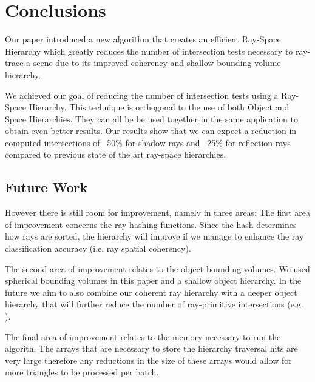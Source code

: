 
\chapter{Conclusions}
\label{chapter:conclusions}

Our paper introduced a new algorithm that creates an efficient Ray-Space Hierarchy which greatly reduces the number of intersection tests necessary to ray-trace a scene due to its improved coherency and shallow bounding volume hierarchy.

\medskip

We achieved our goal of reducing the number of intersection tests using a Ray-Space Hierarchy. This technique is orthogonal to the use of both Object and Space Hierarchies. They can all be be used together in the same application to obtain even better results.
Our results show that we can expect a reduction in computed intersections of ~50\% for shadow rays and ~25\% for reflection rays compared to previous state of the art ray-space hierarchies.

\section{Future Work}
\label{section:future-work}

However there is still room for improvement, namely in three areas: The first area of improvement concerns the ray hashing functions. Since the hash determines how rays are sorted, the hierarchy will improve if we manage to enhance the ray classification accuracy (i.e. ray spatial coherency).

\medskip

The second area of improvement relates to the object bounding-volumes. We used spherical bounding volumes in this paper and a shallow object hierarchy. In the future we aim to also combine our coherent ray hierarchy with a deeper object hierarchy that will further reduce the number of ray-primitive intersections (e.g. \cite{Bradshaw04}).

\medskip

The final area of improvement relates to the memory necessary to run the algorith. The arrays that are necessary to store the hierarchy traversal hits are very large therefore any reductions in the size of these arrays would allow for more triangles to be processed per batch.